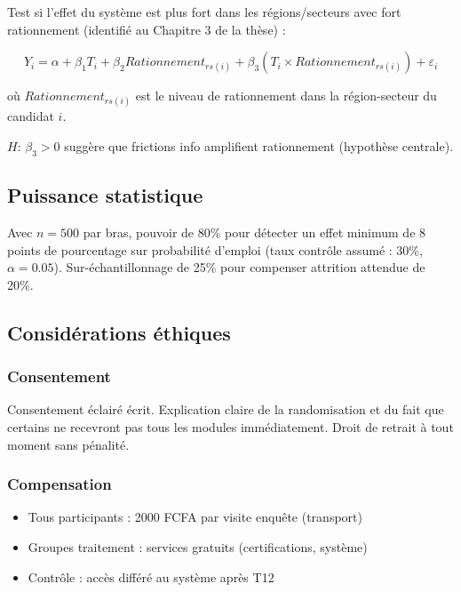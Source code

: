 \documentclass[12pt]{article}
\begin{document}
Test si l'effet du système est plus fort dans les régions/secteurs avec fort rationnement (identifié au Chapitre 3 de la thèse) :

\begin{equation}
Y_i = \alpha + \beta_1 T_i + \beta_2 Rationnement_{rs(i)} + \beta_3 (T_i \times Rationnement_{rs(i)}) + \varepsilon_i
\end{equation}

où $Rationnement_{rs(i)}$ est le niveau de rationnement dans la région-secteur du candidat $i$.

$H$: $\beta_3 > 0$ suggère que frictions info amplifient rationnement (hypothèse centrale).

\subsection{Puissance statistique}

Avec $n=500$ par bras, pouvoir de 80\% pour détecter un effet minimum de 8 points de pourcentage sur probabilité d'emploi (taux contrôle assumé : 30\%, $\alpha=0.05$). Sur-échantillonnage de 25\% pour compenser attrition attendue de 20\%.

\subsection{Considérations éthiques}

\subsubsection{Consentement}

Consentement éclairé écrit. Explication claire de la randomisation et du fait que certains ne recevront pas tous les modules immédiatement. Droit de retrait à tout moment sans pénalité.

\subsubsection{Compensation}

\begin{itemize}
    \item Tous participants : 2000 FCFA par visite enquête (transport)
    \item Groupes traitement : services gratuits (certifications, système)
    \item Contrôle : accès différé au système après T12
\end{itemize}
\end{document}
